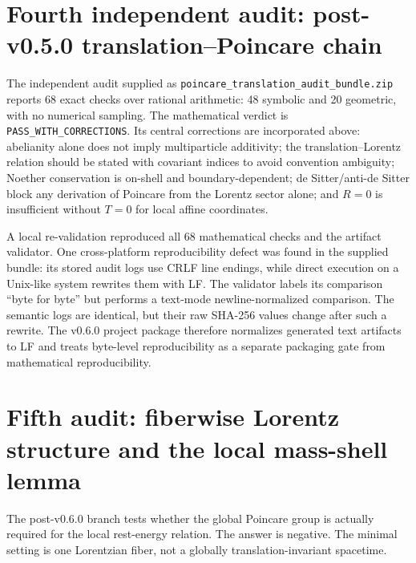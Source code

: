 \documentclass[11pt,a4paper]{article}
\begin{document}
\section{Fourth independent audit: post-v0.5.0 translation--Poincare chain}
The independent audit supplied as \texttt{poincare\_translation\_audit\_bundle.zip} reports 68 exact checks over rational arithmetic: 48 symbolic and 20 geometric, with no numerical sampling.  The mathematical verdict is \texttt{PASS\_WITH\_CORRECTIONS}.  Its central corrections are incorporated above: abelianity alone does not imply multiparticle additivity; the translation--Lorentz relation should be stated with covariant indices to avoid convention ambiguity; Noether conservation is on-shell and boundary-dependent; de Sitter/anti-de Sitter block any derivation of Poincare from the Lorentz sector alone; and $R=0$ is insufficient without $T=0$ for local affine coordinates.

A local re-validation reproduced all 68 mathematical checks and the artifact validator.  One cross-platform reproducibility defect was found in the supplied bundle: its stored audit logs use CRLF line endings, while direct execution on a Unix-like system rewrites them with LF.  The validator labels its comparison ``byte for byte'' but performs a text-mode newline-normalized comparison.  The semantic logs are identical, but their raw SHA-256 values change after such a rewrite.  The v0.6.0 project package therefore normalizes generated text artifacts to LF and treats byte-level reproducibility as a separate packaging gate from mathematical reproducibility.


\section{Fifth audit: fiberwise Lorentz structure and the local mass-shell lemma}
The post-v0.6.0 branch tests whether the global Poincare group is actually required for the local rest-energy relation.  The answer is negative.  The minimal setting is one Lorentzian fiber, not a globally translation-invariant spacetime.
\end{document}
